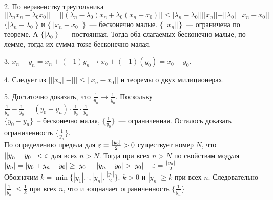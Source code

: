 2. По неравенству треугольника\\
$||\lambda_n x_n - \lambda_0 x_0|| = ||(\lambda_n - \lambda_0) x_n + \lambda_0(x_n - x_0)|| \le |\lambda_n - \lambda_0||||x_n|| + ||\lambda_0||||x_n - x_0||$\\
$\{|\lambda_n - \lambda_0|\}$ и $\{||x_n - x_0||\}$~--- бесконечно малые. $\{||x_n||\}$~--- ограничена по теореме. А $\{|\lambda_0|\}$~--- постоянная. Тогда оба слагаемых бесконечно малые, по лемме, тогда их сумма тоже бесконечно малая.

3. $x_n - y_n = x_n + (-1)y_n \to x_0 + (-1)(y_0) = x_0 - y_0$.

4. Следует из $|||x_n|| - ||| \le ||x_n - x_0||$ и теоремы о двух милиционерах.

5. Достаточно доказать, что $\frac{1}{y_n} \to \frac{1}{y_0}$. Поскольку\\
$\frac{1}{y_n} - \frac{1}{y_0} = (y_0 - y_n)\cdot\frac{1}{y_0}\cdot\frac{1}{y_n}$\\
$\{y_0 - y_n\}$~-- бесконечно малая, $\{\frac{1}{y_0}\}$~--- ограниченная. Осталось доказать ограниченность $\{\frac{1}{y_n}\}$.\\
По определению предела для $\varepsilon = \frac{|y_0|}{2} > 0$ существует номер $N$, что $||y_n - y_0|| < \varepsilon$ для всех $n > N$. Тогда при всех $n > N$ по свойствам модуля\\
$|y_n| = |y_0 + y_n - y_0| \ge |y_0| - |y_n - y_0| > |y_0| - \varepsilon = \frac{|y_0|}{2}$\\
Обозначим $k = \min\{|y_1|, \cdot, |y_n|, \frac{|y_0|}{2}\}$. $k > 0$ и $|y_n| \ge k$ при всех $n$. Следовательно $|\frac{1}{y_n}|\le \frac{1}{k}$ при всех $n$, что и зощначает ограниченность $\{\frac{1}{y_n}\}$